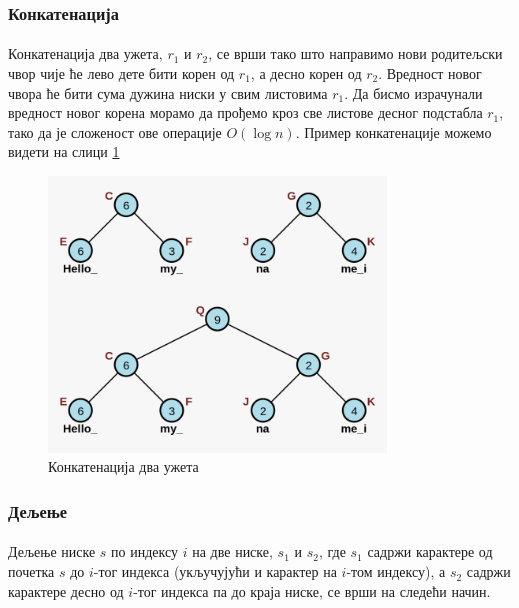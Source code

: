 \documentclass[12pt,oneside]{memoir}
\begin{document}
\subsubsection{Конкатенација}
\paragraph{}
Конкатенација два ужета, \(r_1\) и \(r_2\), се врши тако што направимо нови родитељски чвор
чије ће лево дете бити корен од \(r_1\), а десно корен од  \(r_2\). Вредност новог чвора ће
бити сума дужина ниски у свим листовима \(r_1\). Да бисмо израчунали вредност новог корена
морамо да прођемо кроз све листове десног подстабла \(r_1\), тако да је сложеност ове 
операције \(O(\log{}n)\). Пример конкатенације можемо видети на слици \ref{fig:rope_concat}

\begin{figure}
  \centering
  \includegraphics[width=0.8\textwidth]{images/rope_concat.png}
  \caption{Конкатенација два ужета}
  \label{fig:rope_concat}
\end{figure}

\subsubsection{Дељење}
\paragraph{}
Дељење ниске \(s\) по индексу \(i\) на две ниске, \(s_1\) и \(s_2\),
где \(s_1\) садржи карактере од почетка  \(s\) до \(i\)-тог индекса (укључујући и карактер на 
\(i\)-том индексу), а \(s_2\) садржи карактере десно од \(i\)-тог индекса па до краја ниске,
се врши на следећи начин.
\end{document}
